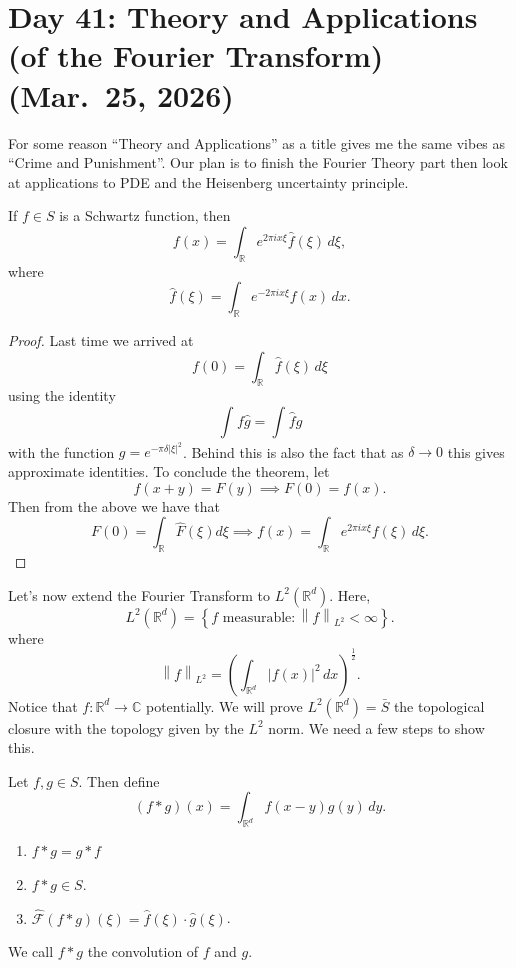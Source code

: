 \section{Day 41: Theory and Applications (of the Fourier Transform) (Mar.\ 25, 2026)}
For some reason ``Theory and Applications'' as a title gives me the same vibes as ``Crime and Punishment''. Our plan is to finish the Fourier Theory part then look at applications to PDE and the Heisenberg uncertainty principle.
\begin{theorem}
	If \( f \in S \) is a Schwartz function, then 
	\[ f(x) = \int_{\mathbb{R}} e^{2 \pi i x \xi} \hat f( \xi) \, d \xi, \]
	where
	\[ \hat f( \xi) = \int_{\mathbb{R}} e^{- 2 \pi i x \xi}f(x) \, dx. \]
\end{theorem}
\begin{proof}
	Last time we arrived at
	\[ f(0) = \int_{\mathbb{R}} \hat f(\xi) \, d \xi \]
	using the identity
	\[ \int_{} f \hat g = \int_{} \hat f g \]
	with the function \( g = e^{-\pi \delta |\xi|^{2}} \). Behind this is also the fact that as \( \delta \to 0 \) this gives approximate identities. To conclude the theorem, let
	\[ f(x+y) = F(y) \implies F(0) = f(x). \]
	Then from the above we have that
	\[ F(0) = \int_{\mathbb{R}} \hat F(\xi) d \xi \implies f(x) = \int_{\mathbb{R}} e^{2 \pi i x \xi} f(\xi) \, d \xi. \]
\end{proof}
Let's now extend the Fourier Transform to \( L^{2}(\mathbb{R}^{d}) \). Here,
\[ L^{2}(\mathbb{R}^{d}) = \left\{ f \text{ measurable} : \left\lVert f \right\rVert_{L^{2}} < \infty \right\}. \]
where
\[
	\left\lVert f \right\rVert_{L^{2}} = \left( \int_{\mathbb{R}^{d}} |f(x)|^{2} \, dx \right)^{\frac{1}{2}}.
\]
Notice that \( f \colon \mathbb{R}^{d} \to \mathbb{C} \) potentially. We will prove \( L^{2}(\mathbb{R}^{d}) = \bar S \) the topological closure with the topology given by the \( L^{2} \) norm. We need a few steps to show this.
\begin{lemma}
	Let \( f, g \in S \). Then define
	\[ (f * g)(x) = \int_{\mathbb{R}^{d}} f(x - y) g(y) \, dy. \]
	\begin{enumerate}
	
		\item \(  f * g = g * f \)
		\item \( f * g \in S \).
		\item \( \hat {\mathcal{F}}(f * g)(\xi) = \hat f(\xi) \cdot \hat g(\xi) \).
	
	\end{enumerate}
	We call \( f * g \) the convolution of \( f \) and \( g \).
\end{lemma}
